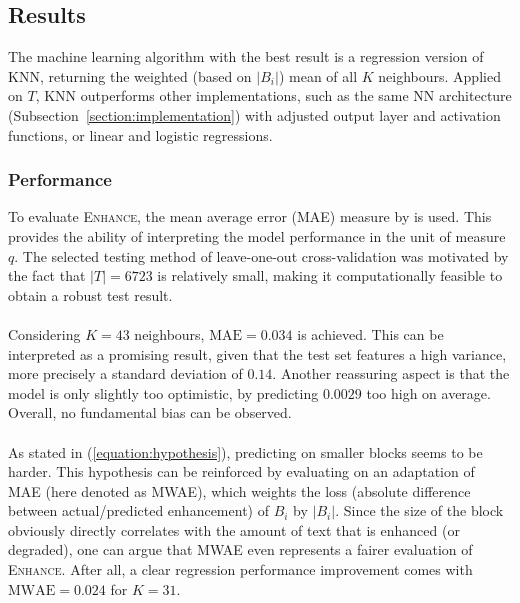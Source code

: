 \documentclass{jdmdh}
\begin{document}
\subsection{Results}
The machine learning algorithm with the best result is a regression version of \textsc{KNN}, returning the weighted (based on $|B_i|$) mean of all $K$ neighbours. Applied on $T$, \textsc{KNN} outperforms other implementations, such as the same \textsc{NN} architecture (Subsection~\ref{section:implementation}) with adjusted output layer and activation functions, or linear and logistic regressions.
\subsubsection{Performance}
To evaluate \textsc{Enhance}, the mean average error (MAE) measure by \citet{willmott} is used. This provides the ability of interpreting the model performance in the unit of measure $q$. The selected testing method of leave-one-out cross-validation was motivated by the fact that $|T|\!=\!6723$ is relatively small, making it computationally feasible to obtain a robust test result.
\\ \\
Considering $K\!=\!43$ neighbours, $\text{MAE}\!=\!0.034$ is achieved. This can be interpreted as a promising result, given that the test set features a high variance, more precisely a standard deviation of $0.14$. Another reassuring aspect is that the model is only slightly too optimistic, by predicting $0.0029$ too high on average. Overall, no fundamental bias can be observed.
\\ \\
As stated in (\ref{equation:hypothesis}), predicting on smaller blocks seems to be harder. This hypothesis can be reinforced by evaluating on an adaptation of MAE (here denoted as MWAE), which weights the loss (absolute difference between actual/predicted enhancement) of $B_i$ by $|B_i|$. Since the size of the block obviously directly correlates with the amount of text that is enhanced (or degraded), one can argue that MWAE even represents a fairer evaluation of \textsc{Enhance}. After all, a clear regression performance improvement comes with $\text{MWAE}\!=\!0.024$ for $K\!=\!31$.
\end{document}
